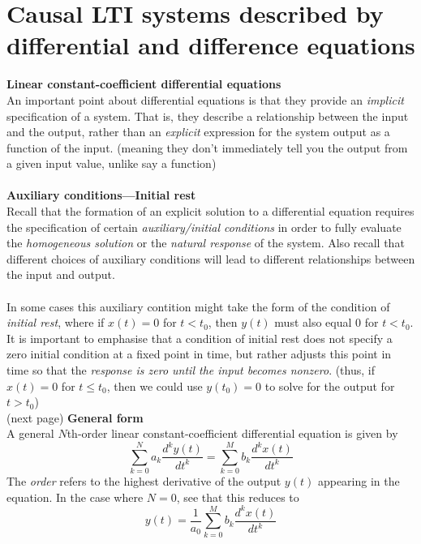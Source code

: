 \documentclass{report}
\begin{document}
\section{Causal LTI systems described by differential and difference equations}
\textbf{Linear constant-coefficient differential equations}\\
An important point about differential equations is that they provide an \textit{implicit} specification of a system. That is, they
describe a relationship between the input and the output, rather than an \textit{explicit} expression for the system output as a 
function of the input. (meaning they don't immediately tell you the output from a given input value, unlike say a function)\\
\vspace{1mm}\\
\textbf{Auxiliary conditions---Initial rest}\\
Recall that the formation of an explicit solution to a differential equation requires the specification of certain 
\textit{auxiliary/initial conditions} in order to fully evaluate the \textit{homogeneous solution} or the 
\textit{natural response} of the system. Also 
recall that different choices of auxiliary conditions will lead to different relationships between the input and output.\\
\vspace{1mm}\\
In some cases this auxiliary contition might take the form of the condition of \textit{initial rest}, where if $x(t)=0$ for 
$t<t_0$, then $y(t)$ must also equal 0 for $t<t_0$. It is important to emphasise that a condition of initial rest does not 
specify a zero initial condition at a fixed point in time, but rather adjusts this point in time so that the \textit{response is zero 
until the input becomes nonzero}. (thus, if $x(t)=0$ for $t\leq t_0$, then we could use $y(t_0)=0$ to solve for the output for $t>t_0$)\\
(next page)\newpage
\noindent\textbf{General form}\\
A general $N$th-order linear constant-coefficient differential equation is given by
\begin{equation*}
\sum^N_{k=0}a_k\frac{d^ky(t)}{dt^k}=\sum^M_{k=0}b_k\frac{d^kx(t)}{dt^k}
\end{equation*}
The \textit{order} refers to the highest derivative of the output $y(t)$ appearing in the equation. In the case where $N=0$, 
see that this reduces to
\begin{equation*}
y(t)=\frac{1}{a_0}\sum^M_{k=0}b_k\frac{d^kx(t)}{dt^k}
\end{equation*}
\end{document}
